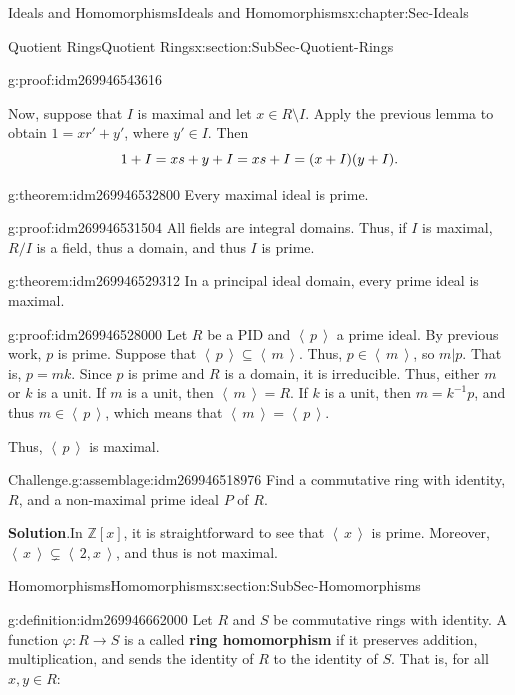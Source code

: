 \documentclass[oneside,10pt,]{book}
\newcommand{\terminology}[1]{\textbf{#1}}
\newcommand{\qedhere}{\relax}
\numberwithin{equation}{section}
\newcommand{\ideal}[1]{\left\langle\, #1 \,\right\rangle}
\def\p{\varphi}
\def\Z{{\mathbb Z}}
\begin{document}
\begin{chapterptx}{Ideals and Homomorphisms}{}{Ideals and Homomorphisms}{}{}{x:chapter:Sec-Ideals}
\begin{sectionptx}{Quotient Rings}{}{Quotient Rings}{}{}{x:section:SubSec-Quotient-Rings}
\begin{proofptx}{}{g:proof:idm269946543616}
\par
Now, suppose that \(I\) is maximal and let \(x\in R\setminus I\). Apply the previous lemma to obtain \(1 = xr' + y'\), where \(y'\in I\). Then%
\begin{equation*}
1 + I = xs+y + I = xs + I = (x+I)(y+I)\text{.}\qedhere
\end{equation*}
%
\end{proofptx}
\begin{theorem}{}{}{g:theorem:idm269946532800}%
Every maximal ideal is prime.%
\end{theorem}
\begin{proofptx}{}{g:proof:idm269946531504}
All fields are integral domains. Thus, if \(I\) is maximal, \(R/I\) is a field, thus a domain, and thus \(I\) is prime.%
\end{proofptx}
\begin{theorem}{}{}{g:theorem:idm269946529312}%
In a principal ideal domain, every prime ideal is maximal.%
\end{theorem}
\begin{proofptx}{}{g:proof:idm269946528000}
Let \(R\) be a PID and \(\ideal{p}\) a prime ideal. By previous work, \(p\) is prime. Suppose that \(\ideal{p} \subseteq \ideal{m}\). Thus, \(p\in \ideal{m}\), so \(m|p\). That is, \(p = mk\). Since \(p\) is prime and \(R\) is a domain, it is irreducible. Thus, either \(m\) or \(k\) is a unit. If \(m\) is a unit, then \(\ideal{m} = R\). If \(k\) is a unit, then \(m = k^{-1} p\), and thus \(m\in \ideal{p}\), which means that \(\ideal{m} = \ideal{p}\).%
\par
Thus, \(\ideal{p}\) is maximal.%
\end{proofptx}
\begin{assemblage}{Challenge.}{g:assemblage:idm269946518976}%
Find a commutative ring with identity, \(R\), and a non-maximal prime ideal \(P\) of \(R\).%
\end{assemblage}
\textbf{Solution}.\quad{}In \(\Z[x]\), it is straightforward to see that \(\ideal{x}\) is prime. Moreover, \(\ideal{x}\subsetneq \ideal{2,x}\), and thus is not maximal.%
\end{sectionptx}
%
%
\typeout{************************************************}
\typeout{************************************************}
%
\begin{sectionptx}{Homomorphisms}{}{Homomorphisms}{}{}{x:section:SubSec-Homomorphisms}
\begin{definition}{}{g:definition:idm269946662000}%
Let \(R\) and \(S\) be commutative rings with identity. A function \(\p : R\to S\) is a called \terminology{ring homomorphism} if it preserves addition, multiplication, and sends the identity of \(R\) to the identity of \(S\). That is, for all \(x,y\in R\):%

\end{definition}
\end{sectionptx}
\end{chapterptx}
\end{document}
